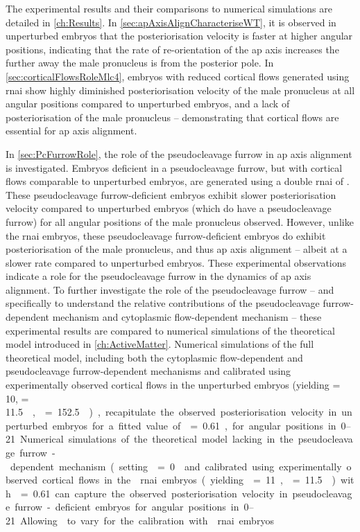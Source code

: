 The experimental results and their comparisons to numerical simulations are detailed in \autoref{ch:Results}. In \autoref{sec:apAxisAlignCharacteriseWT}, it is observed in unperturbed embryos that the posteriorisation velocity is faster at higher angular positions, indicating that the rate of re-orientation of the \ac{ap} axis increases the further away the male pronucleus is from the posterior pole. In \autoref{sec:corticalFlowsRoleMlc4}, embryos with reduced cortical flows generated using  \ac{rnai} show highly diminished posteriorisation velocity of the male pronucleus at all angular positions compared to unperturbed embryos, and a lack of posteriorisation of the male pronucleus -- demonstrating that cortical flows are essential for \ac{ap} axis alignment. 

In \autoref{sec:PcFurrowRole}, the role of the pseudocleavage furrow in \ac{ap} axis alignment is investigated. Embryos deficient in a pseudocleavage furrow, but with cortical flows comparable to unperturbed embryos, are generated using a double \ac{rnai} of . These pseudocleavage furrow-deficient embryos exhibit slower posteriorisation velocity compared to unperturbed embryos (which do have a pseudocleavage furrow) for all angular positions of the male pronucleus observed. However, unlike the  \ac{rnai} embryos, these pseudocleavage furrow-deficient embryos do exhibit posteriorisation of the male pronucleus, and thus \ac{ap} axis alignment -- albeit at a slower rate compared to unperturbed embryos. These experimental observations indicate a role for the pseudocleavage furrow in the dynamics of \ac{ap} axis alignment. To further investigate the role of the pseudocleavage furrow -- and specifically to understand the relative contributions of the pseudocleavage furrow-dependent mechanism and cytoplasmic flow-dependent mechanism -- these experimental results are compared to numerical simulations of the theoretical model introduced in \autoref{ch:ActiveMatter}. Numerical simulations of the full theoretical model, including both the cytoplasmic flow-dependent and pseudocleavage furrow-dependent mechanisms and calibrated using experimentally observed cortical flows in the unperturbed embryos (yielding \hydrodynamicLength = \SI{10}{\unitLength}, \activeRelaxLength = \SI{11.5}{\square\unitLength\per\second}, \nematicLength = \SI{152.5}{\square\unitLength\per\second}), recapitulate the observed posteriorisation velocity in unperturbed embryos for a fitted value of \dragCoefficient = \num{0.61}, for angular positions in \SIrange{0}{21}{\unitAngle}. Numerical simulations of the theoretical model lacking in the pseudocleavage furrow-dependent mechanism (setting \nematicLength = \SI{0}{\square\unitLength\per\second} and calibrated using experimentally observed cortical flows in the  \ac{rnai} embryos (yielding \hydrodynamicLength = \SI{11}{\unitLength}, \activeRelaxLength = \SI{11.5}{\square\unitLength\per\second}) with \dragCoefficient = \num{0.61} can capture the observed posteriorisation velocity in pseudocleavage furrow-deficient embryos for angular positions in \SIrange{0}{21}{\unitAngle}. Allowing \nematicLength to vary for the calibration with  \ac{rnai} embryos 